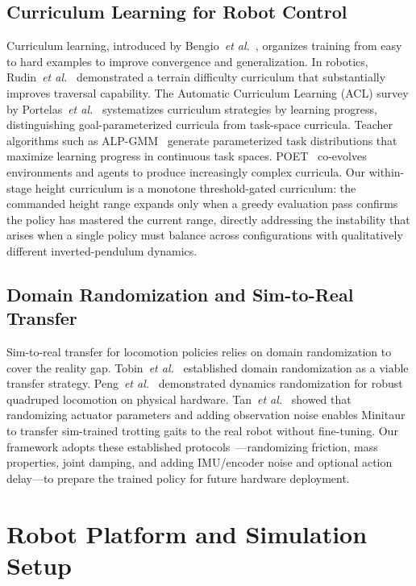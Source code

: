 \documentclass[conference]{IEEEtran}
\begin{document}
\subsection{Curriculum Learning for Robot Control}
Curriculum learning, introduced by Bengio~\emph{et al.}~\cite{bengio2009curriculum},
organizes training from easy to hard examples to improve convergence
and generalization.
In robotics, Rudin~\emph{et al.}~\cite{rudin2022walk} demonstrated a
terrain difficulty curriculum that substantially improves traversal capability.
The Automatic Curriculum Learning (ACL) survey by
Portelas~\emph{et al.}~\cite{portelas2020acl} systematizes curriculum strategies
by learning progress, distinguishing goal-parameterized curricula from
task-space curricula.
Teacher algorithms such as ALP-GMM~\cite{portelas2020teacher} generate
parameterized task distributions that maximize learning progress in
continuous task spaces.
POET~\cite{wang2019poet} co-evolves environments and agents to produce
increasingly complex curricula.
Our within-stage height curriculum is a monotone threshold-gated curriculum:
the commanded height range expands only when a greedy evaluation pass
confirms the policy has mastered the current range, directly addressing
the instability that arises when a single policy must balance across
configurations with qualitatively different inverted-pendulum dynamics.

\subsection{Domain Randomization and Sim-to-Real Transfer}
Sim-to-real transfer for locomotion policies relies on domain randomization
to cover the reality gap.
Tobin~\emph{et al.}~\cite{tobin2017domain} established domain randomization
as a viable transfer strategy.
Peng~\emph{et al.}~\cite{peng2018simtoreal} demonstrated dynamics
randomization for robust quadruped locomotion on physical hardware.
Tan~\emph{et al.}~\cite{tan2018simtoreal} showed that randomizing actuator
parameters and adding observation noise enables Minitaur to transfer
sim-trained trotting gaits to the real robot without fine-tuning.
Our framework adopts these established protocols~\cite{tobin2017domain,peng2018simtoreal,tan2018simtoreal}---randomizing friction,
mass properties, joint damping, and adding IMU/encoder noise and
optional action delay---to prepare the trained policy for future hardware deployment.

\section{Robot Platform and Simulation Setup}
\end{document}
